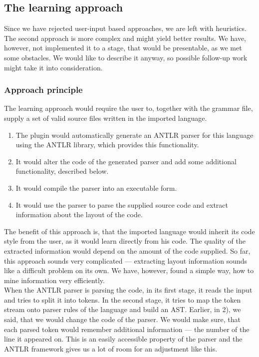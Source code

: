 \subsection{The learning approach}
\label{chap:learning_approach}

Since we have rejected user-input based approaches, we are left with heuristics.
The second approach is more complex and might yield better results.
We have, however, not implemented it to a stage, that would be presentable, as we met some obstacles.
We would like to describe it anyway, so possible follow-up work might take it into consideration.
\\

\subsubsection{Approach principle}

The learning approach would require the user to, together with the grammar file, supply a set of valid source files written in the imported language.

\begin{enumerate}
	\item The plugin would automatically generate an ANTLR parser for this language using the ANTLR library, which provides this functionality.
	
	\item It would alter the code of the generated parser and add some additional functionality, described below.
	
	\item It would compile the parser into an executable form.
	
	\item It would use the parser to parse the supplied source code and extract information about the layout of the code.
\end{enumerate}

The benefit of this approach is, that the imported language would inherit its code style from the user, as it would learn directly from his code.
The quality of the extracted information would depend on the amount of the code supplied.
So far, this approach sounds very complicated --- extracting layout information sounds like a difficult problem on its own.
We have, however, found a simple way, how to mine information very efficiently.
\\

When the ANTLR parser is parsing the code, in its first stage, it reads the input and tries to split it into tokens.
In the second stage, it tries to map the token stream onto parser rules of the language and build an AST.
Earlier, in 2), we said, that we would change the code of the parser.
We would make sure, that each parsed token would remember additional information --- the number of the line it appeared on.
This is an easily accessible property of the parser and the ANTLR framework gives us a lot of room for an adjustment like this.
\\


